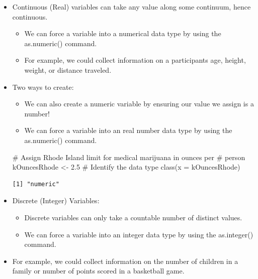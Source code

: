 \documentclass[
  letterpaper,
  DIV=11,
  numbers=noendperiod]{scrreprt}
\newenvironment{Shaded}{\begin{snugshade}}{\end{snugshade}}
\newcommand{\AttributeTok}[1]{\textcolor[rgb]{0.40,0.45,0.13}{#1}}
\newcommand{\CommentTok}[1]{\textcolor[rgb]{0.37,0.37,0.37}{#1}}
\newcommand{\FloatTok}[1]{\textcolor[rgb]{0.68,0.00,0.00}{#1}}
\newcommand{\FunctionTok}[1]{\textcolor[rgb]{0.28,0.35,0.67}{#1}}
\newcommand{\NormalTok}[1]{\textcolor[rgb]{0.00,0.23,0.31}{#1}}
\newcommand{\OtherTok}[1]{\textcolor[rgb]{0.00,0.23,0.31}{#1}}
\providecommand{\tightlist}{%
  \setlength{\itemsep}{0pt}\setlength{\parskip}{0pt}}\usepackage{longtable,booktabs,array}
\begin{document}
\begin{itemize}
\item
  Continuous (Real) variables can take any value along some continuum,
  hence continuous.

  \begin{itemize}
  \tightlist
  \item
    We can force a variable into a numerical data type by using the
    as.numeric() command.
  \item
    For example, we could collect information on a participants age,
    height, weight, or distance traveled.
  \end{itemize}
\item
  Two ways to create:

  \begin{itemize}
  \tightlist
  \item
    We can also create a numeric variable by ensuring our value we
    assign is a number!
  \item
    We can force a variable into an real number data type by using the
    as.numeric() command.
  \end{itemize}

\begin{Shaded}
\begin{Highlighting}[]
\CommentTok{\# Assign Rhode Island limit for medical marijuana in ounces per}
\CommentTok{\# person}
\NormalTok{kOuncesRhode }\OtherTok{\textless{}{-}} \FloatTok{2.5}
\CommentTok{\# Identify the data type}
\FunctionTok{class}\NormalTok{(}\AttributeTok{x =}\NormalTok{ kOuncesRhode)}
\end{Highlighting}
\end{Shaded}

\begin{verbatim}
[1] "numeric"
\end{verbatim}
\item
  Discrete (Integer) Variables:

  \begin{itemize}
  \tightlist
  \item
    Discrete variables can only take a countable number of distinct
    values.
  \item
    We can force a variable into an integer data type by using the
    as.integer() command.
  \end{itemize}
\item
  For example, we could collect information on the number of children in
  a family or number of points scored in a basketball game.
\end{itemize}
\end{document}
